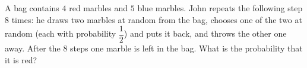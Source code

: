 A bag contains $4$ red marbles and $5$ blue marbles. John repeats the following step $8$ times: he draws two marbles at random from the bag, chooses one of the two at random (each with probability $\dfrac{1}{2}$) and puts it back, and throws the other one away. After the $8$ steps one marble is left in the bag. What is the probability that it is red?
